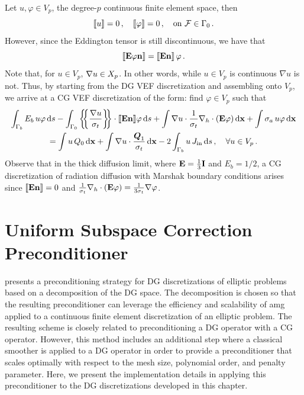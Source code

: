 \documentclass[../doc.tex]{subfiles}
\begin{document}
Let $u,\varphi \in V_p$, the degree-$p$ continuous finite element space, then 
	\begin{equation}
		\left\llbracket u \right\rrbracket = 0 \,, \quad \left\llbracket\varphi \right\rrbracket = 0 \,, \quad \text{on} \ \mathcal{F}\in\Gamma_0 \,. 
	\end{equation}
However, since the Eddington tensor is still discontinuous, we have that 
	\begin{equation}
		\left\llbracket\boldsymbol{\mathrm{E}}\varphi\boldsymbol{\mathrm{n}} \right\rrbracket = \left\llbracket\boldsymbol{\mathrm{E}}\boldsymbol{\mathrm{n}} \right\rrbracket \varphi \,. 
	\end{equation}
Note that, for $u\in V_p$, $\nabla u \in X_p$. In other words, while $u\in V_p$ is continuous $\nabla u$ is not. Thus, by starting from the DG VEF discretization and assembling onto $V_p$, we arrive at a CG VEF discretization of the form: find $\varphi \in V_p$ such that 
	\begin{multline} \label{dgvef:cg}
		\int_{\Gamma_b} E_b\, u \varphi \ud s - \int_{\Gamma_0} \avg{\frac{\nabla u}{\sigma_t}} \cdot \jump{\E\n}\!\varphi \ud s 
		+ \int \nabla u \cdot \frac{1}{\sigma_t}\nablah\cdot\paren{\E\varphi} \ud \x + \int \sigma_a\, u \varphi \ud \x \\ 
		= \int u\, Q_0 \ud \x + \int \nabla u \cdot \frac{\vec{Q}_1}{\sigma_t} \ud \x - 2\int_{\Gamma_b} u\, \Jin \ud s \,, \quad \forall u \in V_p \,. 
	\end{multline}
Observe that in the thick diffusion limit, where $\boldsymbol{\mathrm{E}} = \frac{1}{3}\boldsymbol{\mathrm{I}}$ and $E_b = 1/2$, a CG discretization of radiation diffusion with Marshak boundary conditions arises since $\left\llbracket\boldsymbol{\mathrm{E}}\boldsymbol{\mathrm{n}} \right\rrbracket = 0$ and $\frac{1}{\sigma_t}\nabla_h\cdot\left( \boldsymbol{\mathrm{E}}\varphi \right) = \frac{1}{3\sigma_t}\nabla \varphi$. 

\section{Uniform Subspace Correction Preconditioner} \label{dgvef_sec:subspace}
\textcite{Pazner2021} presents a preconditioning strategy for DG discretizations of elliptic problems based on a decomposition of the DG space. The decomposition is chosen so that the resulting preconditioner can leverage the efficiency and scalability of \gls{amg} applied to a continuous finite element discretization of an elliptic problem. The resulting scheme is closely related to preconditioning a DG operator with a CG operator. However, this method includes an additional step where a classical smoother is applied to a DG operator in order to provide a preconditioner that scales optimally with respect to the mesh size, polynomial order, and penalty parameter. Here, we present the implementation details in applying this preconditioner to the DG discretizations developed in this chapter. 
\end{document}
